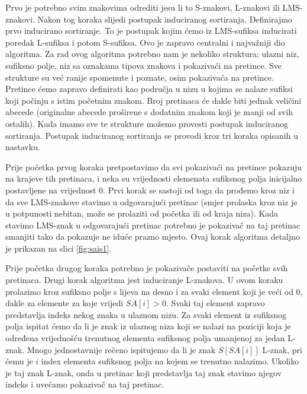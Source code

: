 Prvo je potrebno svim znakovima odrediti jesu li to S-znakovi, L-znakovi ili LMS-znakovi. Nakon tog koraka slijedi postupak induciranog sortiranja. Definirajmo prvo inducirano sortiranje. To je postupak kojim ćemo iz LMS-sufiksa inducirati poredak L-sufiksa i potom S-sufiksa. Ovo je zapravo centralni i najvažniji dio algoritma. Za rad ovog algoritma potrebno nam je nekoliko struktura: ulazni niz, sufiksno polje, niz sa oznakama tipova znakova i pokazivaći na pretince. Sve strukture su već ranije spomenute i poznate, osim pokazivaća na pretince. Pretince ćemo zapravo definirati kao područja u nizu u kojima se nalaze sufiksi koji počinju s  istim početnim znakom. Broj pretinaca će dakle biti jednak veličini abecede (originalne abecede proširene s dodatnim znakom koji je manji od svih ostalih). Kada imamo sve te strukture možemo provesti postupak induciranog sortiranja. Postupak induciranog sortiranja se provodi kroz tri koraka opisanih u nastavku.

Prije početka prvog koraka pretpostavimo da svi pokazivaći na pretince pokazuju na krajeve tih pretinaca, i neka su vrijednosti elemenata sufiksnog polja inicijalno postavljene na vrijednost 0. Prvi korak se sastoji od toga da prođemo kroz niz i da sve LMS-znakove stavimo u odgovarajući pretinac (smjer prolaska kroz niz je u potpunosti nebitan, može se prolaziti od početka ili od kraja niza). Kada stavimo LMS-znak u odgovarajući pretinac potrebno je pokazivač na taj pretinac smanjiti tako da pokazuje ne iduće prazno mjesto. Ovaj korak algoritma detaljno je prikazan na slici \ref{fig:sais1}.


Prije početka drugog koraka potrebno je pokazivače postaviti na početke svih pretinaca. Drugi korak algoritma jest induciranje L-znakova. U ovom koraku prolazimo kroz sufiksno polje s lijeva na desno i za svaki element koji je veći od 0, dakle za elemente za koje vrijedi $SA[i]>0$. Svaki taj  element zapravo predstavlja indeks nekog znaka u ulaznom nizu. Za svaki element iz sufiksnog polja ispitat ćemo da li je znak iz ulaznog niza koji se nalazi na poziciji koja je određena vrijednošću trenutnog elementa sufiksnog polja umanjenoj za jedan L-znak. Mnogo jednostavnije rečeno  ispitujemo da li je znak $S[SA[i]]$ L-znak, pri ćemu je $i$ index elementa sufiksnog polja na kojem se trenutno nalazimo. Ukoliko je taj znak L-znak, onda u pretinac koji predstavlja taj znak stavimo njegov indeks i uvećamo pokazivač na taj pretinac. 



